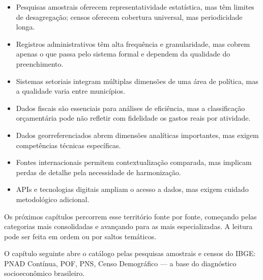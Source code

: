 \begin{itemize}
  \item Pesquisas amostrais oferecem representatividade estatística, mas têm limites de desagregação; censos oferecem cobertura universal, mas periodicidade longa.
  \item Registros administrativos têm alta frequência e granularidade, mas cobrem apenas o que passa pelo sistema formal e dependem da qualidade do preenchimento.
  \item Sistemas setoriais integram múltiplas dimensões de uma área de política, mas a qualidade varia entre municípios.
  \item Dados fiscais são essenciais para análises de eficiência, mas a classificação orçamentária pode não refletir com fidelidade os gastos reais por atividade.
  \item Dados georreferenciados abrem dimensões analíticas importantes, mas exigem competências técnicas específicas.
  \item Fontes internacionais permitem contextualização comparada, mas implicam perdas de detalhe pela necessidade de harmonização.
  \item APIs e tecnologias digitais ampliam o acesso a dados, mas exigem cuidado metodológico adicional.
\end{itemize}

Os próximos capítulos percorrem esse território fonte por fonte, começando pelas categorias mais consolidadas e avançando para as mais especializadas. A leitura pode ser feita em ordem ou por saltos temáticos.

\medskip

O capítulo seguinte abre o catálogo pelas pesquisas amostrais e censos do IBGE: PNAD Contínua, POF, PNS, Censo Demográfico --- a base do diagnóstico socioeconômico brasileiro.
